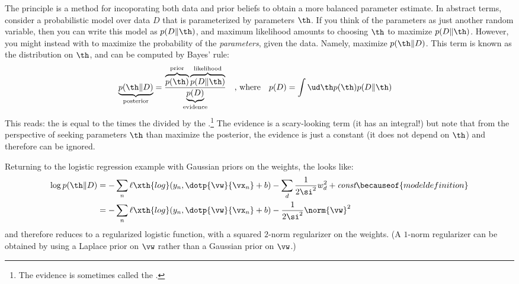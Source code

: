 The  principle is a method for
incoporating both data and prior beliefs to obtain a more balanced
parameter estimate.  In abstract terms, consider a probabilistic model
over data $D$ that is parameterized by parameters $\th$.  If you think
of the parameters as just another random variable, then you can write
this model as $p(D \| \th)$, and maximum likelihood amounts to
choosing $\th$ to maximize $p(D \| \th)$.  However, you might instead
with to maximize the probability of the \emph{parameters}, given the
data.  Namely, maximize $p(\th \| D)$.  This term is known as the
 distribution on $\th$, and can be computed by
Bayes' rule:
%
\begin{align}
  \underbrace{p(\th \| D)}_{\text{posterior}}
  &= \frac {
       \overbrace{p(\th)}^{\text{prior}}
       \overbrace{p(D \| \th)}^{\text{likelihood}}
     } {
       \underbrace{p(D)}_{\text{evidence}}
     }
 \quad\text{, where}\quad
 p(D) = \int \ud\th p(\th) p(D \| \th)
\end{align}
%
This reads: the  is equal to the 
times the  divided by the
.\footnote{The evidence is sometimes called the
  .}  The evidence is a scary-looking
term (it has an integral!) but note that from the perspective of
seeking parameters $\th$ than maximize the posterior, the evidence is
just a constant (it does not depend on $\th$) and therefore can be
ignored.

Returning to the logistic regression example with Gaussian priors on
the weights, the  looks like:
%
\begin{align}
   \log p(\th \| D)
&= - \sum_n \ell\xth{log}(y_n, \dotp{\vw}{\vx_n} + b)
   - \sum_d \frac 1 {2 \si^2} w_d^2
   + \textit{const}
   \becauseof{model definition}\\
&= - \sum_n \ell\xth{log}(y_n, \dotp{\vw}{\vx_n} + b)
   - \frac 1 {2 \si^2} \norm{\vw}^2
\end{align}
%
and therefore reduces to a regularized logistic function, with a
squared $2$-norm regularizer on the weights.  (A $1$-norm regularizer
can be obtained by using a Laplace prior on $\vw$ rather than a
Gaussian prior on $\vw$.)



